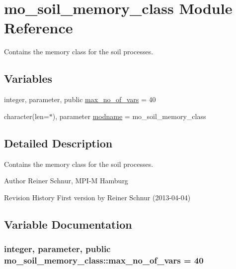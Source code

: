 \hypertarget{namespacemo__soil__memory__class}{}\section{mo\+\_\+soil\+\_\+memory\+\_\+class Module Reference}
\label{namespacemo__soil__memory__class}


Contains the memory class for the soil processes.  


\subsection*{Variables}
\begin{DoxyCompactItemize}
\item 
integer, parameter, public \hyperlink{namespacemo__soil__memory__class_a505bdae995ec01a50f196260bcbd6f15}{max\+\_\+no\+\_\+of\+\_\+vars} = 40
\item 
character(len=$\ast$), parameter \hyperlink{namespacemo__soil__memory__class_a3cbf2b7edbe366c9e50eb360d3a1bcbd}{modname} = \textquotesingle{}mo\+\_\+soil\+\_\+memory\+\_\+class\textquotesingle{}
\end{DoxyCompactItemize}


\subsection{Detailed Description}
Contains the memory class for the soil processes. 

\begin{DoxyAuthor}{Author}
Reiner Schnur, M\+P\+I-\/\+M Hamburg
\end{DoxyAuthor}
\begin{DoxyParagraph}{Revision History}
First version by Reiner Schnur (2013-\/04-\/04) 
\end{DoxyParagraph}


\subsection{Variable Documentation}
\hypertarget{namespacemo__soil__memory__class_a505bdae995ec01a50f196260bcbd6f15}{}
\subsubsection[{max\+\_\+no\+\_\+of\+\_\+vars}]{\setlength{\rightskip}{0pt plus 5cm}integer, parameter, public mo\+\_\+soil\+\_\+memory\+\_\+class\+::max\+\_\+no\+\_\+of\+\_\+vars = 40}\label{namespacemo__soil__memory__class_a505bdae995ec01a50f196260bcbd6f15}


